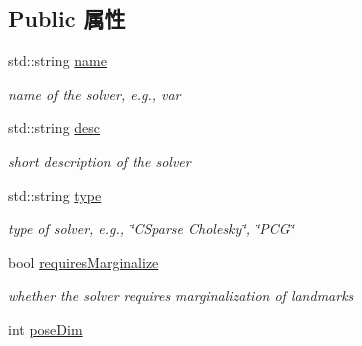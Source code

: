 \subsection*{Public 属性}
\begin{DoxyCompactItemize}
\item 
\hypertarget{structg2o_1_1OptimizationAlgorithmProperty_aedb3c54122d6a75d49e1677e836bac22}{std\-::string \hyperlink{structg2o_1_1OptimizationAlgorithmProperty_aedb3c54122d6a75d49e1677e836bac22}{name}}\label{structg2o_1_1OptimizationAlgorithmProperty_aedb3c54122d6a75d49e1677e836bac22}

\begin{DoxyCompactList}\small\item\em name of the solver, e.\-g., var \end{DoxyCompactList}\item 
\hypertarget{structg2o_1_1OptimizationAlgorithmProperty_a9390204f7ff2f092241f55656d8458b1}{std\-::string \hyperlink{structg2o_1_1OptimizationAlgorithmProperty_a9390204f7ff2f092241f55656d8458b1}{desc}}\label{structg2o_1_1OptimizationAlgorithmProperty_a9390204f7ff2f092241f55656d8458b1}

\begin{DoxyCompactList}\small\item\em short description of the solver \end{DoxyCompactList}\item 
\hypertarget{structg2o_1_1OptimizationAlgorithmProperty_a199f33f536f48f6ceda037f6a2ff206d}{std\-::string \hyperlink{structg2o_1_1OptimizationAlgorithmProperty_a199f33f536f48f6ceda037f6a2ff206d}{type}}\label{structg2o_1_1OptimizationAlgorithmProperty_a199f33f536f48f6ceda037f6a2ff206d}

\begin{DoxyCompactList}\small\item\em type of solver, e.\-g., \char`\"{}\-C\-Sparse Cholesky\char`\"{}, \char`\"{}\-P\-C\-G\char`\"{} \end{DoxyCompactList}\item 
\hypertarget{structg2o_1_1OptimizationAlgorithmProperty_a179837f3866e8786ce3a7f7a34bdda44}{bool \hyperlink{structg2o_1_1OptimizationAlgorithmProperty_a179837f3866e8786ce3a7f7a34bdda44}{requires\-Marginalize}}\label{structg2o_1_1OptimizationAlgorithmProperty_a179837f3866e8786ce3a7f7a34bdda44}

\begin{DoxyCompactList}\small\item\em whether the solver requires marginalization of landmarks \end{DoxyCompactList}\item 
\hypertarget{structg2o_1_1OptimizationAlgorithmProperty_a2c0c87eeaa423e8c944cfa846eb6a553}{int \hyperlink{structg2o_1_1OptimizationAlgorithmProperty_a2c0c87eeaa423e8c944cfa846eb6a553}{pose\-Dim}}\label{structg2o_1_1OptimizationAlgorithmProperty_a2c0c87eeaa423e8c944cfa846eb6a553}


\end{DoxyCompactItemize}
